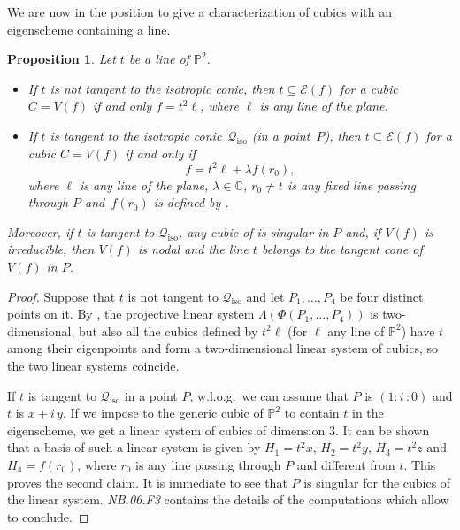 \documentclass[a4paper, 11pt, reqno]{amsart}
\theoremstyle{plain}
\newtheorem{prop}[lemma]{Proposition}
\theoremstyle{definition}
\newcommand{\C}{\mathbb{C}}
\newcommand{\nb}[2]{\textsl{{NB}.{#1}.{#2}}}
\newcommand{\iii}{\textit{i}\,}
\newcommand{\iso}{\mathcal{Q}_{\mathrm{iso}}}
\newcommand{\Eig}[1]{\mathcal{E}\!\left( {#1} \right)}
\begin{document}
We are now in the position to give a characterization of cubics with an eigenscheme containing a line.
\begin{prop}
\label{proposition:eigenline_tangent}
Let $t$ be a line of $\mathbb{P}^2$.
%
\begin{itemize}
   \item 
   If $t$ is not tangent to the isotropic conic, then $t \subseteq \Eig{f}$ for a cubic $C=V(f)$ if and 
only $f = t^2\ell$, where $\ell$ is any line of the plane.
  \item 
  If $t$ is tangent to the isotropic conic~$\iso$ (in a point~$P$),
then $t \subseteq \Eig{f}$ for a cubic $C=V(f)$ if and only if
  \begin{equation}
  \label{eq:cubics_with_tangent_eigenline}
    f = t^2 \ell+\lambda f(r_0),
  \end{equation}
  where $\ell$ is any line of the plane, $\lambda \in \C$, 
  $r_0\neq t$ is any fixed line passing through $P$
  and~$f(r_0)$ is defined by .
  \end{itemize}
  Moreover, if $t$ is tangent to $\iso$, any cubic of
   is singular in $P$ and, if $V(f)$ is irreducible, then $V(f)$ is nodal and the line $t$ belongs to the tangent cone of $V(f)$ in $P$.
%
\end{prop}
\begin{proof}
Suppose that $t$ is not tangent to $\iso$ and let $P_1, \dots, P_4$ be four 
distinct points on it. By , the projective linear system
$\Lambda(\Phi(P_1, \dotsc, P_4))$ is two-dimensional, but also all the cubics
defined by $t^2\ell$ (for $\ell$ any line of $\mathbb{P}^2$) have $t$ among
their eigenpoints and form a
two-dimensional linear system of cubics, so the two linear systems
coincide.

If $t$ is tangent to $\iso$ in a point $P$, w.l.o.g.\ we can assume that
$P$ is $(1: \iii: 0)$ and $t$ is $x+\iii y$. If we impose to the generic
cubic of $\mathbb{P}^2$ to contain $t$ in the eigenscheme, we get a linear
system of cubics of dimension $3$. It can be shown that a basis of such a linear system is given by $H_1 = t^2x$, $H_2 = t^2y$, $H_3 = t^2z$ and
$H_4 = f(r_0)$, where $r_0$ is any line passing through $P$ and different from $t$. This proves the
second claim. It is immediate to see that $P$ is singular for the cubics of the linear system. \nb{06}{F3} contains the details of the computations which allow to conclude.
\end{proof}
\end{document}

